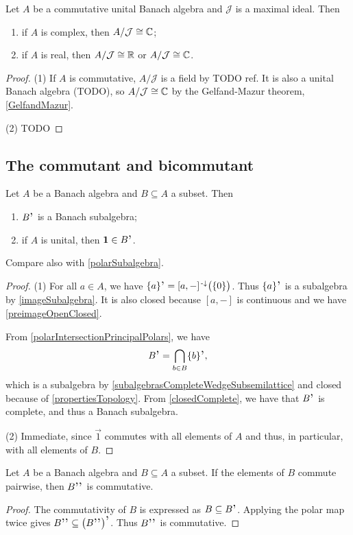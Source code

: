 \begin{proposition} \label{commutativeBanachAlgebraIdeals}
Let $A$ be a commutative unital Banach algebra and $\mathcal{J}$ is a maximal ideal. Then 
\begin{enumerate}
\item if $A$ is complex, then $A/\mathcal{J} \cong \mathbb{C}$;
\item if $A$ is real, then $A/\mathcal{J} \cong \mathbb{R}$ or $A/\mathcal{J} \cong \mathbb{C}$.
\end{enumerate}
\end{proposition}
\begin{proof}
(1) If $A$ is commutative, $A/\mathcal{J}$ is a field by TODO ref. It is also a unital Banach algebra (TODO), so $A/\mathcal{J} \cong \mathbb{C}$ by the Gelfand-Mazur theorem, \ref{GelfandMazur}.

(2) TODO
\end{proof}

\subsection{The commutant and bicommutant}
\begin{lemma} \label{commutantBanachSubalgebra}
Let $A$ be a Banach algebra and $B\subseteq A$ a subset. Then
\begin{enumerate}
\item $B^{\comm}$ is a Banach subalgebra;
\item if $A$ is unital, then $\vec{1}\in B^{\comm}$.
\end{enumerate}
\end{lemma}
Compare also with \ref{polarSubalgebra}.
\begin{proof}
(1) For all $a\in A$, we have $\{a\}^{\comm} = [a,-]^{\preimf}\big(\{0\}\big)$. Thus $\{a\}^{\comm}$ is a subalgebra by \ref{imageSubalgebra}. It is also closed because $[a, -]$ is continuous and we have \ref{preimageOpenClosed}.

From \ref{polarIntersectionPrincipalPolars}, we have
\[ B^{\comm} = \bigcap_{b\in B}\{b\}^{\comm}, \]
which is a subalgebra by \ref{subalgebrasCompleteWedgeSubsemilattice} and closed because of \ref{propertiesTopology}. From \ref{closedComplete}, we have that $B^{\comm}$ is complete, and thus a Banach subalgebra.

(2) Immediate, since $\vec{1}$ commutes with all elements of $A$ and thus, in particular, with all elements of $B$.
\end{proof}

\begin{lemma} \label{bicommutantCommutativeSetCommutative}
Let $A$ be a Banach algebra and $B\subseteq A$ a subset. If the elements of $B$ commute pairwise, then $B^{\comm\comm}$ is commutative.
\end{lemma}
\begin{proof}
The commutativity of $B$ is expressed as $B\subseteq B^{\comm}$. Applying the polar map twice gives $B^{\comm\comm}\subseteq \big(B^{\comm\comm}\big)^{\comm}$. Thus $B^{\comm\comm}$ is commutative.
\end{proof}

